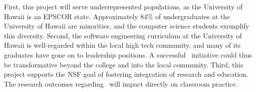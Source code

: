 \medskip 

  First, this project will serve
underrepresented populations, as the University of Hawaii is an EPSCOR
state. Approximately 84\% of undergraduates at the University of Hawaii are
minorities, and the computer science students exemplify this diversity.
Second, the software engineering curriculum at the University of Hawaii is
well-regarded within the local high tech community, and many of its
graduates have gone on to leadership positions. A successful \eCT\
initiative could thus be transformative beyond the college and into the
local community.  Third, this project supports the NSF goal of fostering
integration of research and education.  The research outcomes regarding
\eCT\ will impact directly on classroom practice.  
